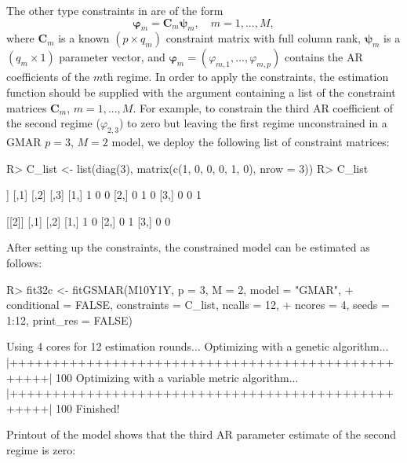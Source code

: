 \documentclass[nojss]{jss} %
\begin{document}
The other type constraints in  are of the form
\begin{equation*}
\boldsymbol{\varphi}_m = \boldsymbol{C}_m\boldsymbol{\psi}_m, \quad m=1,...,M,
\end{equation*}
where $\boldsymbol{C}_m$ is a known $(p\times q_m)$ constraint matrix with full column rank, $\boldsymbol{\psi}_m$ is a $(q_m \times 1)$ parameter vector, and $\boldsymbol{\varphi}_m=(\varphi_{m,1},...,\varphi_{m,p})$ contains the AR coefficients of the $m$th regime. In order to apply the constraints, the estimation function should be supplied with the argument  containing a list of the constraint matrices $\boldsymbol{C}_m$, $m=1,...,M$. For example, to constrain the third AR coefficient of the second regime ($\varphi_{2,3}$) to zero but leaving the first regime unconstrained in a GMAR $p=3$, $M=2$ model, we deploy the following list of constraint matrices:
%
\begin{CodeChunk}
\begin{CodeInput}
R> C_list <- list(diag(3), matrix(c(1, 0, 0, 0, 1, 0), nrow = 3))
R> C_list
\end{CodeInput}
\begin{CodeOutput}
[[1]]
     [,1] [,2] [,3]
[1,]    1    0    0
[2,]    0    1    0
[3,]    0    0    1

[[2]]
     [,1] [,2]
[1,]    1    0
[2,]    0    1
[3,]    0    0
\end{CodeOutput}
\end{CodeChunk}
%
After setting up the constraints, the constrained model can be estimated as follows:
%
\begin{CodeChunk}
\begin{CodeInput}
R> fit32c <- fitGSMAR(M10Y1Y, p = 3, M = 2, model = "GMAR",
+    conditional = FALSE, constraints = C_list, ncalls = 12,
+    ncores = 4, seeds = 1:12, print_res = FALSE)
\end{CodeInput}
\begin{CodeOutput}
Using 4 cores for 12 estimation rounds...
Optimizing with a genetic algorithm...
  |++++++++++++++++++++++++++++++++++++++++++++++++++| 100%
Optimizing with a variable metric algorithm...
  |++++++++++++++++++++++++++++++++++++++++++++++++++| 100%
Finished!
\end{CodeOutput}
\end{CodeChunk}
%
Printout of the model shows that the third AR parameter estimate of the second regime is zero:
%
\end{document}
